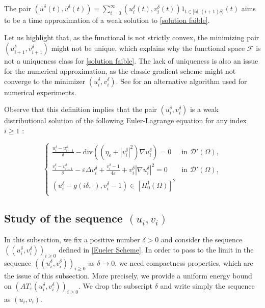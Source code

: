 \documentclass[reqno,12pt,twoside]{amsart}
\numberwithin{equation}{section} \numberwithin{theorem}{section}
\numberwithin{proposition}{section} \numberwithin{lemma}{section}
\numberwithin{corollary}{section}
\numberwithin{definition}{section} \numberwithin{remark}{section}
\begin{document}
The pair $(\overline{u}^\delta(t), \overline{v}^\delta(t)) = \sum_{i=0}^\infty (u_i^\delta(t), v_i^\delta(t)) 1_{t\in [i\delta, (i+1)\delta)}(t)$ aims to be a time approximation of a weak solution to \eqref{solution faible}. 

\smallskip

Let us highlight that, as the functional is not strictly convex, the minimizing pair $(u_{i+1}^\delta, v_{i+1}^\delta)$ might not be unique, which explains why the functional space $\mathcal{F}$ is not a uniqueness class for \autoref{solution faible}. The lack of uniqueness is also an issue for the numerical approximation, as the classic gradient scheme might not converge to the minimizer $(u_i^\delta, v_i^\delta)$. See \cite{BM14} for an alternative algorithm used for numerical experiments.

\medskip

Observe that this definition implies that the pair $(u_i^\delta, v_i^\delta)$ is a weak distributional solution of the following Euler-Lagrange equation for any index $i\geqslant 1$ : 

\begin{equation}\label{EL approché discret}
\left\{\begin{array}{ll}
\displaystyle\frac{u_i^\delta - u_{i-1}^\delta}{\delta} - \text{div}((\eta_\varepsilon + |v_i^\delta|^2) \nabla u_i^\delta) = 0 & \text{in } \mathcal{D}'(\Omega),\\
\displaystyle\frac{v_i^\delta - v_{i-1}^\delta}{\delta} - \varepsilon\Delta v_i^\delta + \frac{v_i^\delta -1}{4\varepsilon} + v_i^\delta |\nabla u_i^\delta|^2 =0 & \text{in } \mathcal{D}'(\Omega),\\
(u_i^\delta - g(i\delta , \cdot) , v_i^\delta - 1) \in [H_0^1(\Omega)]^2\\
\end{array}\right.
\end{equation}

\subsection{Study of the sequence $(u_i , v_i)$}

In this subsection, we fix a positive number $\delta >0$ and consider the sequence $((u_i^\delta, v_i^\delta))_{i\geqslant 0}$ defined in \autoref{Eueler Scheme}. In order to pass to the limit in the sequence $((u_i^\delta, v_i^\delta))_{i\geqslant 0}$ as $\delta \rightarrow 0$, we need compactness properties, which are the issue of this subsection. More precisely, we provide a uniform energy bound on $(AT_\varepsilon (u_i^\delta, v_i^\delta))_{i\geqslant 0}$. We drop the subscript $\delta$ and write simply the sequence as $(u_i, v_i)$. 
\end{document}
